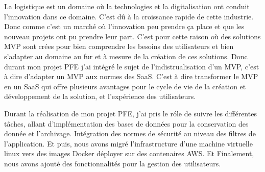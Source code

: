 La logistique est un domaine o\`u la technologies et la digitalisation ont conduit 
l'innovation dans ce domaine. C'est dû \`a la croissance rapide de cette industrie.
Donc comme c'est un march\'e o\`u l'innovation peu prendre \c{c}a place et que les 
nouveau projets ont pu prendre leur part. C'est pour cette raison o\`u des solutions
MVP sont cr\'ees pour bien comprendre les besoins des utilisateurs et bien s'adapter
au domaine au fur et \`a mesure de la cr\'eation de ces solutions. Donc durant mon 
projet PFE j'ai int\'egr\'e le sujet de l'indistrualisation d'un MVP, c'est \`a dire
d'adapter un MVP aux normes des SaaS. C'est \`a dire transformer le MVP en un SaaS qui
offre plusieurs avantages pour le cycle de vie de la cr\'eation et d\'eveloppement de
la solution, et l'exp\'erience des utilisateurs.

Durant la r\'ealisation de mon projet PFE, j'ai pris le r\'ole de suivre les diff\'erentes
t\^aches, allant d'impl\'ementation des bases de donn\'ees pour la conservation des
donn\'ee et l'archivage. Int\'egration des normes de s\'ecurit\'e au niveau des filtres
de l'application. Et puis, nous avons migr\'e l'infrastructure d'une  machine virtuelle
linux vers des images Docker d\'eployer sur des contenaires AWS. Et Finalement, nous
avons ajout\'e des fonctionnalit\'es pour la gestion des utilisateurs.

